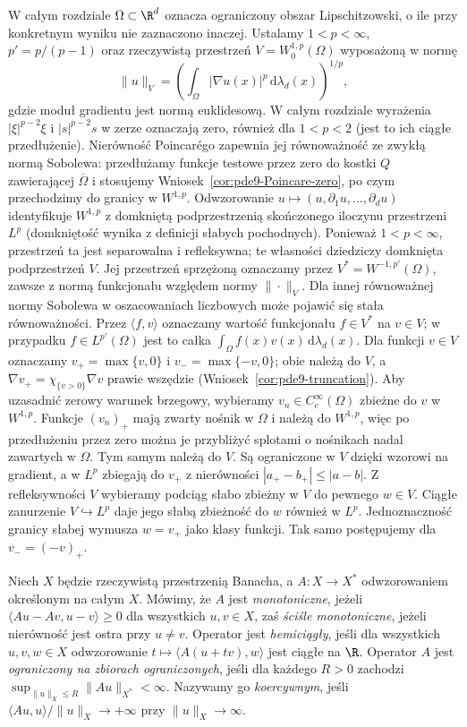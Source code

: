 W całym rozdziale $\Omega\subset\R^d$ oznacza ograniczony obszar
Lipschitzowski, o ile przy konkretnym wyniku nie zaznaczono inaczej.
Ustalamy $1<p<\infty$, $p'=p/(p-1)$ oraz rzeczywistą
przestrzeń $V=W_0^{1,p}(\Omega)$ wyposażoną w normę
\[
 \|u\|_V=\left(\int_\Omega|\nabla u(x)|^p\,
                         \mathrm d\lambda_d(x)\right)^{1/p},
\]
gdzie moduł gradientu jest normą euklidesową.
W całym rozdziale wyrażenia $|\xi|^{p-2}\xi$
i $|s|^{p-2}s$ w zerze oznaczają zero, również
dla $1<p<2$ (jest to ich ciągłe przedłużenie).
Nierówność Poincarégo zapewnia jej równoważność ze zwykłą
normą Sobolewa: przedłużamy funkcje testowe przez zero
do kostki $Q$ zawierającej $\overline\Omega$ i stosujemy
Wniosek~\ref{cor:pde9-Poincare-zero}, po czym przechodzimy
do granicy w $W^{1,p}$. Odwzorowanie
$u\mapsto(u,\partial_1u,\ldots,\partial_du)$ identyfikuje
$W^{1,p}$ z domkniętą podprzestrzenią skończonego
iloczynu przestrzeni $L^p$ (domkniętość wynika
z definicji słabych pochodnych). Ponieważ $1<p<\infty$,
przestrzeń ta jest separowalna i refleksywna; te własności
dziedziczy domknięta podprzestrzeń $V$. Jej przestrzeń
sprzężoną oznaczamy przez $V^*=W^{-1,p'}(\Omega)$,
zawsze z normą funkcjonału względem normy $\|\cdot\|_V$.
Dla innej równoważnej normy Sobolewa w oszacowaniach
liczbowych może pojawić się stała równoważności.
Przez $\langle f,v\rangle$ oznaczamy wartość funkcjonału
$f\in V^*$ na $v\in V$; w przypadku $f\in L^{p'}(\Omega)$
jest to całka $\int_\Omega f(x)v(x)\,\mathrm d\lambda_d(x)$.
Dla funkcji $v\in V$ oznaczamy $v_+=\max\{v,0\}$ i
$v_-=\max\{-v,0\}$; obie należą do $V$, a
$\nabla v_+=\chi_{\{v>0\}}\nabla v$ prawie wszędzie
(Wniosek~\ref{cor:pde9-truncation}). Aby uzasadnić
zerowy warunek brzegowy, wybieramy $v_n\in C_c^\infty(\Omega)$
zbieżne do $v$ w $W^{1,p}$. Funkcje $(v_n)_+$
mają zwarty nośnik w $\Omega$ i należą do $W^{1,p}$,
więc po przedłużeniu przez zero można je przybliżyć
splotami o nośnikach nadal zawartych w $\Omega$.
Tym samym należą do $V$. Są ograniczone w $V$
dzięki wzorowi na gradient, a w $L^p$ zbiegają do $v_+$
z nierówności $|a_+-b_+|\le|a-b|$.
Z refleksywności $V$ wybieramy podciąg słabo zbieżny
w $V$ do pewnego $w\in V$. Ciągłe zanurzenie
$V\hookrightarrow L^p$ daje jego słabą zbieżność
do $w$ również w $L^p$. Jednoznaczność granicy
słabej wymusza $w=v_+$ jako klasy funkcji.
Tak samo postępujemy dla $v_-=(-v)_+$.

\begin{definicja}\label{def:pde26-monotone}
Niech $X$ będzie rzeczywistą przestrzenią Banacha, a
$A:X\to X^*$ odwzorowaniem określonym na całym $X$.
Mówimy, że $A$ jest
\emph{monotoniczne}, jeżeli
$\langle Au-Av,u-v\rangle\ge0$ dla wszystkich $u,v\in X$,
zaś \emph{ściśle monotoniczne}, jeżeli nierówność jest ostra
przy $u\ne v$. Operator jest \emph{hemiciągły}, jeśli dla
wszystkich $u,v,w\in X$ odwzorowanie
$t\mapsto\langle A(u+tv),w\rangle$ jest ciągłe na $\R$.
Operator $A$ jest \emph{ograniczony na zbiorach ograniczonych},
jeśli dla każdego $R>0$ zachodzi
$\sup_{\|u\|_X\le R}\|Au\|_{X^*}<\infty$.
Nazywamy go \emph{koercywnym}, jeśli
$\langle Au,u\rangle/\|u\|_X\to+\infty$
przy $\|u\|_X\to\infty$.
\end{definicja}


